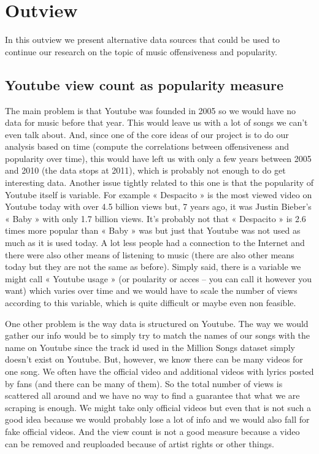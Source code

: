 \documentclass[11pt]{article}
\begin{document}
\section{Outview}
In this outview we present alternative data sources that could be used to continue our research on the topic of music offensiveness and popularity.

\subsection{Youtube view count as popularity measure}
The main problem is that Youtube was founded in 2005 so we would have no data for music before that
year. This would leave us with a lot of songs we can’t even talk about. And, since one of the core ideas of
our project is to do our analysis based on time (compute the correlations between offensiveness and
popularity over time), this would have left us with only a few years between 2005 and 2010 (the data
stops at 2011), which is probably not enough to do get interesting data. Another issue tightly related to
this one is that the popularity of Youtube itself is variable. For example « Despacito » is the most viewed
video on Youtube today with over 4.5 billion views but, 7 years ago, it was Justin Bieber’s « Baby » with
only 1.7 billion views. It’s probably not that « Despacito » is 2.6 times more popular than « Baby » was
but just that Youtube was not used as much as it is used today. A lot less people had a connection to the
Internet and there were also other means of listening to music (there are also other means today but they
are not the same as before). Simply said, there is a variable we might call « Youtube usage » (or poularity
or acces – you can call it however you want) which varies over time and we would have to scale the
number of views according to this variable, which is quite difficult or maybe even non feasible.


One other problem is the way data is structured on Youtube. The way we would gather our info would be
to simply try to match the names of our songs with the name on Youtube since the track id used in the
Million Songs dataset simply doesn’t exist on Youtube. But, however, we know there can be many videos
for one song. We often have the official video and additional videos with lyrics posted by fans (and there
can be many of them). So the total number of views is scattered all around and we have no way to find a
guarantee that what we are scraping is enough. We might take only official videos but even that is not
such a good idea because we would probably lose a lot of info and we would also fall for fake official
videos. And the view count is not a good measure because a video can be removed and reuploaded
because of artist rights or other things.
\end{document}
